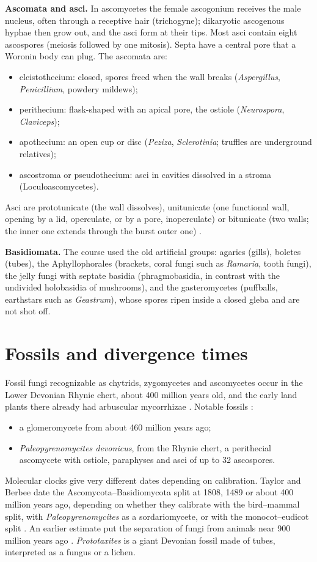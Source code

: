 \textbf{Ascomata and asci.}
In ascomycetes the female ascogonium
receives the male nucleus, often through a
receptive hair (trichogyne); dikaryotic
ascogenous hyphae then grow out, and the
asci form at their tips. Most asci contain
eight ascospores (meiosis followed by one
mitosis). Septa have a central pore that a
Woronin body can plug. The ascomata
are:
\begin{itemize}
\item cleistothecium: closed, spores freed
when the wall breaks (\emph{Aspergillus},
\emph{Penicillium}, powdery mildews);
\item perithecium: flask-shaped with an
apical pore, the ostiole (\emph{Neurospora},
\emph{Claviceps});
\item apothecium: an open cup or disc
(\emph{Peziza}, \emph{Sclerotinia}; truffles
are underground relatives);
\item ascostroma or pseudothecium: asci in
cavities dissolved in a stroma
(Loculoascomycetes).
\end{itemize}
Asci are prototunicate (the wall dissolves),
unitunicate (one functional wall, opening by
a lid, operculate, or by a pore,
inoperculate) or bitunicate (two walls; the
inner one extends through the burst outer
one)
\cite[Chapter 8]{webster2007fungi}.

\textbf{Basidiomata.}
The course used the old artificial groups:
agarics (gills), boletes (tubes), the
Aphyllophorales (brackets, coral fungi such
as \emph{Ramaria}, tooth fungi), the jelly
fungi with septate basidia
(phragmobasidia, in contrast with the
undivided holobasidia of mushrooms), and the
gasteromycetes (puffballs, earthstars such as
\emph{Geastrum}), whose spores ripen inside a
closed gleba and are not shot off.

\section{Fossils and divergence times}
\label{section-fossils}

Fossil fungi recognizable as chytrids,
zygomycetes and ascomycetes occur in the
Lower Devonian Rhynie chert, about 400
million years old, and the early land plants
there already had arbuscular mycorrhizae
\cite[Section 1.5]{webster2007fungi}.
Notable fossils \cite{taylor2006dating}:
\begin{itemize}
\item a glomeromycete from about 460 million
years ago;
\item \emph{Paleopyrenomycites devonicus},
from the Rhynie chert, a perithecial
ascomycete with ostiole, paraphyses and asci
of up to 32 ascospores.
\end{itemize}
Molecular clocks give very different dates
depending on calibration. Taylor and Berbee
date the Ascomycota--Basidiomycota split at
1808, 1489 or about 400 million years ago,
depending on whether they calibrate with the
bird--mammal split, with
\emph{Paleopyrenomycites} as a
sordariomycete, or with the
monocot--eudicot split
\cite{taylor2006dating}.
An earlier estimate put the separation of
fungi from animals near 900 million years
ago
\cite[Section 1.5]{webster2007fungi}.
\emph{Prototaxites} is a giant Devonian fossil
made of tubes, interpreted as a fungus or a
lichen.

